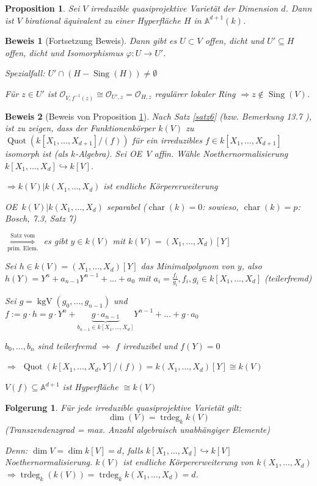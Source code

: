 \documentclass[a4paper, 12pt, numbers=noendperiod, chapterprefix=true]{scrbook}
\theoremstyle{break}
\newtheorem{Prop}[Def]{Proposition}
\newtheorem{Folg}[Def]{Folgerung}
\theoremstyle{nonumberbreak}
\newtheorem{Bew}{Beweis}
\theoremstyle{nonumberplain}
\DeclareMathOperator{\Quot}{Quot}
\DeclareMathOperator{\Sing}{Sing}
\DeclareMathOperator{\chara}{char}
\DeclareMathOperator{\kgv}{kgV}
\DeclareMathOperator{\trdeg}{trdeg}
\newcommand{\A}{\mathbb{A}}
\newcommand{\calO}{\mathcal{O}}
\renewcommand{\OE}{O\!\!E~}
\begin{document}
\begin{Prop}\label{19.8}
Sei $V$ irreduzible quasiprojektive Variet\"at der Dimension $d$. Dann ist $V$ birational \"aquivalent zu einer Hyperfl\"ache $H$ in $\A^{d+1}(k)$.
\end{Prop}

\begin{Bew}[Fortsetzung Beweis]
Dann gibt es $U \subset V$ offen, dicht und $U'\subseteq H$ offen, dicht und Isomorphismus $\varphi:U\to U'$.

\emph{Spezialfall}: $U'\cap(H-\Sing(H))\ne \emptyset$

F\"ur $z\in U'$ ist $\calO_{V,f^{-1}(z)}\cong \calO_{U',z}=\calO_{H,z}$ regul\"arer lokaler Ring $\Rightarrow z\notin\Sing(V)$.
\end{Bew}

\begin{Bew}[Beweis von Proposition \ref{19.8}]
Nach Satz \ref{satz6} (bzw. Bemerkung 13.7 ), ist zu zeigen, dass der Funktionenk\"orper $k(V)$ zu $\Quot(k[X_1,\ldots ,X_{d+1}]/(f))$ f\"ur ein irreduzibles $f\in k[X_1,\ldots ,X_{d+1}]$ isomorph ist (als $k$-Algebra). Sei \OE $V$ affin. W\"ahle Noethernormalisierung $k[X_1,\ldots ,X_d]\hookrightarrow k[V]$.

$\Rightarrow k(V)|k(X_1,\ldots ,X_d)$ ist endliche K\"orpererweiterung

\OE $k(V)|k(X_1,\ldots ,X_d)$ separabel ($\chara(k)=0$: sowieso, $\chara(k)=p$: Bosch, 7.3, Satz 7)

$\overset{\text{Satz vom}}{\underset{\text{prim. Elem.}}{\Longrightarrow}}$ es gibt $y\in k(V)$ mit $k(V)=(X_1,\ldots ,X_d)[Y]$

Sei $h\in k(V)=(X_1,\ldots ,X_d)[Y]$ das Minimalpolynom von $y$, also $h(Y)=Y^n+a_{n-1}Y^{n-1}+\ldots +a_0$ mit $a_i=\frac{f_i}{g_i}, f_i, g_i \in k[X_1,\ldots ,X_d]$ (teilerfremd)

Sei $g=\kgv(g_0,\ldots ,g_{n-1})$ und $f:=g\cdot h= g\cdot Y^n+\underbrace{g\cdot a_{n-1}}_{b_{n-1}\in k[X_1,\ldots ,X_d]}Y^{n-1}+\ldots +g\cdot a_0$

$b_0,\ldots ,b_n$ sind teilerfremd $\Rightarrow$ $f$ irreduzibel und $f(Y)=0$

$\Rightarrow$ $\Quot(k[X_1,\ldots ,X_d,Y]/(f))=k(X_1,\ldots ,X_d)[Y]\cong k(V)$

$V(f)\subseteq\A^{d+1}$ ist Hyperfl\"ache $\cong k(V)$
\end{Bew}

\begin{Folg}
F\"ur jede irreduzible quasiprojektive Variet\"at gilt:
\[\dim(V)=\trdeg_kk(V)\]
(Transzendenzgrad = max. Anzahl algebraisch unabh\"angiger Elemente)

\emph{Denn:} $\dim V=\dim k[V]=d$, falls $k[X_1,\ldots ,X_d]\hookrightarrow k[V]$ Noethernormalisierung. $k(V)$ ist endliche K\"orpererweiterung von $k(X_1,\ldots ,X_d)$ $\Rightarrow \trdeg_k(k(V))=\trdeg_kk(X_1,\ldots ,X_d)=d$.
\end{Folg}
\end{document}
